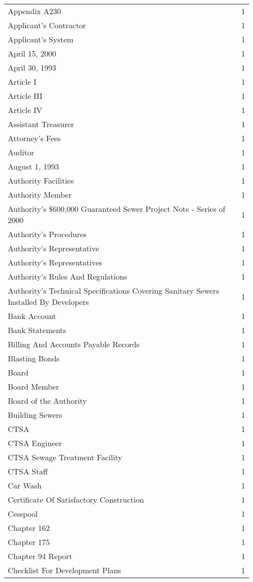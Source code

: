 \begin{longtable}{p{} p{}}
Appendix A230 & 1 \\
Applicant's Contractor & 1 \\
Applicant's System & 1 \\
April 15, 2000 & 1 \\
April 30, 1993 & 1 \\
Article I & 1 \\
Article III & 1 \\
Article IV & 1 \\
Assistant Treasurer & 1 \\
Attorney's Fees & 1 \\
Auditor & 1 \\
August 1, 1993 & 1 \\
Authority Facilities & 1 \\
Authority Member & 1 \\
Authority's \$600,000 Guaranteed Sewer Project Note - Series of 2000 & 1 \\
Authority's Procedures & 1 \\
Authority's Representative & 1 \\
Authority's Representatives & 1 \\
Authority's Rules And Regulations & 1 \\
Authority's Technical Specifications Covering Sanitary Sewers Installed By Developers & 1 \\
Bank Account & 1 \\
Bank Statements & 1 \\
Billing And Accounts Payable Records & 1 \\
Blasting Bonds & 1 \\
Board & 1 \\
Board Member & 1 \\
Board of the Authority & 1 \\
Building Sewers & 1 \\
CTSA & 1 \\
CTSA Engineer & 1 \\
CTSA Sewage Treatment Facility & 1 \\
CTSA Staff & 1 \\
Car Wash & 1 \\
Certificate Of Satisfactory Construction & 1 \\
Cesspool & 1 \\
Chapter 162 & 1 \\
Chapter 175 & 1 \\
Chapter 94 Report & 1 \\
Checklist For Development Plans & 1 \\

\end{longtable}
